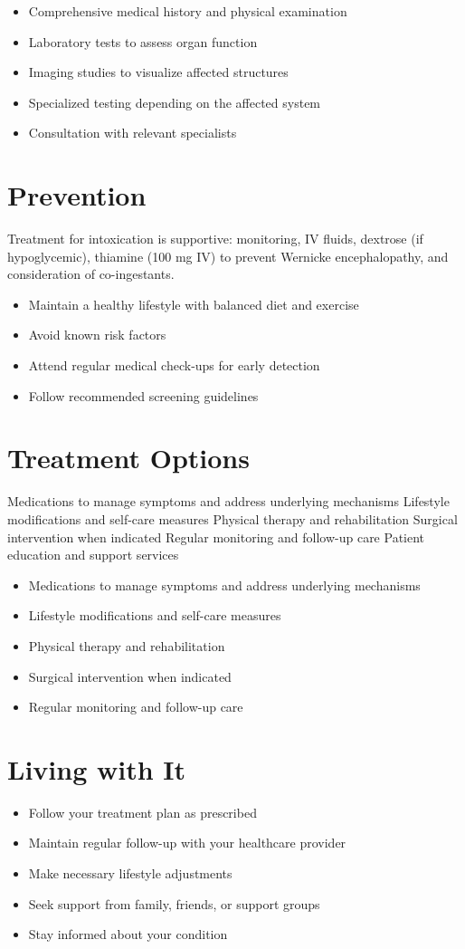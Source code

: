 \begin{itemize}[noitemsep]
  \item Comprehensive medical history and physical examination
  \item Laboratory tests to assess organ function
  \item Imaging studies to visualize affected structures
  \item Specialized testing depending on the affected system
  \item Consultation with relevant specialists
\end{itemize}
\section{Prevention}
Treatment for intoxication is supportive: monitoring, IV fluids, dextrose (if hypoglycemic), thiamine (100 mg IV) to prevent Wernicke encephalopathy, and consideration of co-ingestants.

\begin{itemize}[noitemsep]
  \item Maintain a healthy lifestyle with balanced diet and exercise
  \item Avoid known risk factors
  \item Attend regular medical check-ups for early detection
  \item Follow recommended screening guidelines
\end{itemize}
\section{Treatment Options}
Medications to manage symptoms and address underlying mechanisms Lifestyle modifications and self-care measures Physical therapy and rehabilitation Surgical intervention when indicated Regular monitoring and follow-up care Patient education and support services

\begin{itemize}[noitemsep]
  \item Medications to manage symptoms and address underlying mechanisms
  \item Lifestyle modifications and self-care measures
  \item Physical therapy and rehabilitation
  \item Surgical intervention when indicated
  \item Regular monitoring and follow-up care
\end{itemize}
\section{Living with It}
\begin{itemize}[noitemsep]
  \item Follow your treatment plan as prescribed
  \item Maintain regular follow-up with your healthcare provider
  \item Make necessary lifestyle adjustments
  \item Seek support from family, friends, or support groups
  \item Stay informed about your condition
\end{itemize}
